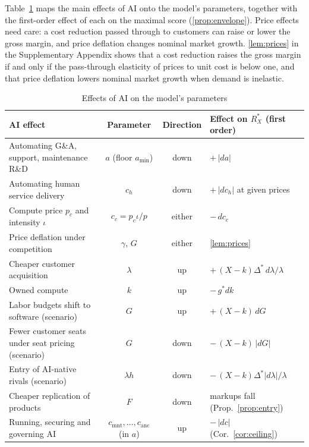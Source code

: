 Table~\ref{tab:ai-map} maps the main effects of AI onto the model's parameters, together with the first-order effect of each on the maximal score (\autoref{prop:envelope}). Price effects need care: a cost reduction passed through to customers can raise or lower the gross margin, and price deflation changes nominal market growth. \autoref{lem:prices} in the Supplementary Appendix shows that a cost reduction raises the gross margin if and only if the pass-through elasticity of prices to unit cost is below one, and that price deflation lowers nominal market growth when demand is inelastic.

\begin{table}[t]
\centering
\caption{Effects of AI on the model's parameters}\label{tab:ai-map}
\small
\setlength{\tabcolsep}{4pt}
\begin{tabular}{@{}lccl@{}}
\toprule
AI effect & Parameter & Direction & Effect on $R_X^*$ (first order)\\
\midrule
Automating G\&A, support, maintenance R\&D & $a$ (floor $a_{\min}$) & down & $+\,|da|$\\
Automating human service delivery & $c_h$ & down & $+\,|dc_h|$ at given prices\\
Compute price $p_c$ and intensity $\iota$ & $c_c=p_c\iota/p$ & either & $-\,dc_c$\\
Price deflation under competition & $\gamma$, $G$ & either & \autoref{lem:prices}\\
Cheaper customer acquisition & $\lambda$ & up & $+\,(X-k)\Delta^*\,d\lambda/\lambda$\\
Owned compute & $k$ & up & $-\,g^*dk$\\
Labor budgets shift to software (scenario) & $G$ & up & $+\,(X-k)\,dG$\\
Fewer customer seats under seat pricing (scenario) & $G$ & down & $-\,(X-k)\,|dG|$\\
Entry of AI-native rivals (scenario) & $\lambda h$ & down & $-\,(X-k)\Delta^*|d\lambda|/\lambda$\\
Cheaper replication of products & $F$ & down & markups fall (Prop.~\ref{prop:entry})\\
Running, securing and governing AI & $c_{\mathrm{mnt}},\dots,c_{\mathrm{anc}}$ (in $a$) & up & $-\,|dc|$ (Cor.~\ref{cor:ceiling})\\
\bottomrule
\end{tabular}
\end{table}

